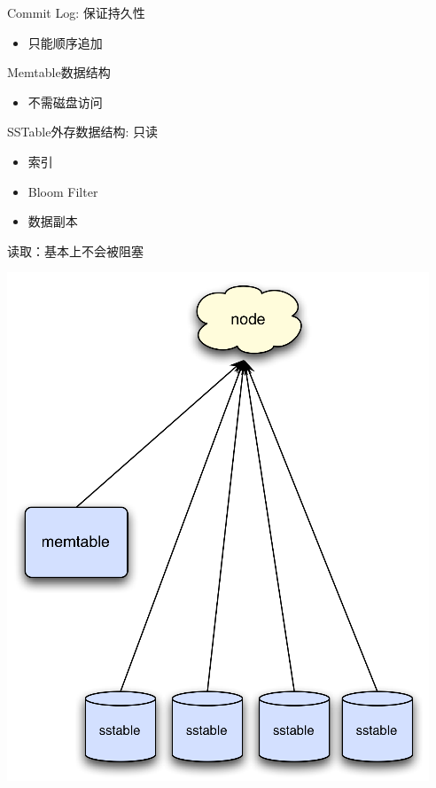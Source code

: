\documentclass{beamer}
\begin{document}
\begin{CJK}{UTF8}{gbsn}
\begin{frame}{}
  \begin{block}{Commit Log: 保证持久性}
    \begin{itemize}
    \item {只能顺序追加}
    \end{itemize}
  \end{block}
  \pause
  \begin{block}{Memtable数据结构}
    \begin{itemize}
    \item {不需磁盘访问}
    \end{itemize}
  \end{block}
  \pause
  \begin{block}{SSTable外存数据结构: 只读}
    \begin{itemize}
    \item {索引}
    \item {Bloom Filter}
    \item {数据副本}
    \end{itemize}
  \end{block}
\end{frame}

\begin{frame}{读取：基本上不会被阻塞}
  \begin{center}
    \includegraphics[scale=0.4]{./images/read-process}
  \end{center}
\end{frame}


\end{CJK}
\end{document}
